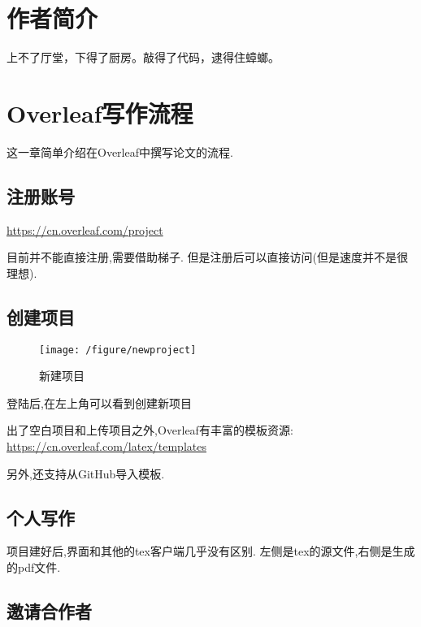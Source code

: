 \documentclass[]{ctexbook}
\begin{document}
\hypertarget{author}{%
\chapter*{作者简介}\label{author}}


上不了厅堂，下得了厨房。敲得了代码，逮得住蟑螂。

\mainmatter

\hypertarget{intro}{%
\chapter{Overleaf写作流程}\label{intro}}

这一章简单介绍在Overleaf中撰写论文的流程.

\hypertarget{section-2}{%
\section{注册账号}\label{section-2}}

\url{https://cn.overleaf.com/project}

目前并不能直接注册,需要借助梯子.
但是注册后可以直接访问(但是速度并不是很理想).

\hypertarget{section-3}{%
\section{创建项目}\label{section-3}}

\begin{figure}
\centering
\texttt{[image: /figure/newproject]}
\caption{新建项目}
\end{figure}

登陆后,在左上角可以看到创建新项目

出了空白项目和上传项目之外,Overleaf有丰富的模板资源:
\url{https://cn.overleaf.com/latex/templates}

另外,还支持从GitHub导入模板.

\hypertarget{section-4}{%
\section{个人写作}\label{section-4}}

项目建好后,界面和其他的tex客户端几乎没有区别.
左侧是tex的源文件,右侧是生成的pdf文件.

\hypertarget{section-5}{%
\section{邀请合作者}\label{section-5}}
\end{document}
